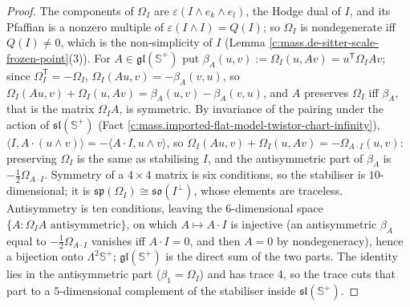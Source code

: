 \documentclass[11pt]{article}
\theoremstyle{definition}
\theoremstyle{plain}
\providecommand{\CS}{}\renewcommand{\CS}{{\mathbb{S}^{+}}}
\providecommand{\ip}{}\renewcommand{\ip}[2]{\langle #1, #2\rangle}
\begin{document}
\begin{proof}
The components of $\Omega_{I}$ are $\varepsilon(I\wedge e_{k}\wedge e_{l})$, the Hodge dual of $I$, and its Pfaffian is a nonzero multiple of $\varepsilon(I\wedge I) = Q(I)$; so $\Omega_{I}$ is nondegenerate iff $Q(I) \neq 0$, which is the non-simplicity of $I$ (Lemma \ref{c:mass.de-sitter-scale-frozen-point}(3)). For $A \in \mathfrak{gl}(\CS)$ put $\beta_{A}(u,v) := \Omega_{I}(u, Av) = u^{\mathsf T}\Omega_{I}Av$; since $\Omega_{I}^{\mathsf T} = -\Omega_{I}$, $\Omega_{I}(Au,v) = -\beta_{A}(v,u)$, so $\Omega_{I}(Au,v) + \Omega_{I}(u,Av) = \beta_{A}(u,v) - \beta_{A}(v,u)$, and $A$ preserves $\Omega_{I}$ iff $\beta_{A}$, that is the matrix $\Omega_{I}A$, is symmetric. By invariance of the pairing under the action of $\mathfrak{sl}(\CS)$ (Fact \ref{c:mass.imported-flat-model-twistor-chart-infinity}), $\ip{I}{A\cdot(u\wedge v)} = -\ip{A\cdot I}{u\wedge v}$, so $\Omega_{I}(Au,v) + \Omega_{I}(u,Av) = -\Omega_{A\cdot I}(u,v)$: preserving $\Omega_{I}$ is the same as stabilising $I$, and the antisymmetric part of $\beta_{A}$ is $-\tfrac12\Omega_{A\cdot I}$. Symmetry of a $4\times 4$ matrix is six conditions, so the stabiliser is $10$-dimensional; it is $\mathfrak{sp}(\Omega_{I}) \cong \mathfrak{so}(I^{\perp})$, whose elements are traceless. Antisymmetry is ten conditions, leaving the $6$-dimensional space $\{A : \Omega_{I}A \text{ antisymmetric}\}$, on which $A \mapsto A\cdot I$ is injective (an antisymmetric $\beta_{A}$ equal to $-\tfrac12\Omega_{A\cdot I}$ vanishes iff $A\cdot I = 0$, and then $A = 0$ by nondegeneracy), hence a bijection onto $\Lambda^{2}\CS$; $\mathfrak{gl}(\CS)$ is the direct sum of the two parts. The identity lies in the antisymmetric part ($\beta_{1} = \Omega_{I}$) and has trace $4$, so the trace cuts that part to a $5$-dimensional complement of the stabiliser inside $\mathfrak{sl}(\CS)$.


\end{proof}
\end{document}

